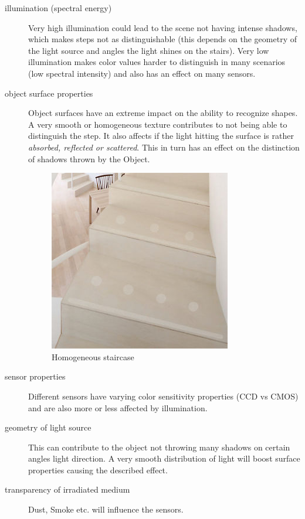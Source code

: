 \documentclass[a4paper,12pt]{article}
\begin{document}
	\begin{description}
		\item[illumination (spectral energy)] Very high illumination could lead to the scene not having intense shadows, which makes steps not as distinguishable (this depends on the geometry of the light source and angles the light shines on the stairs). Very low illumination makes color values harder to distinguish in many scenarios (low spectral intensity) and also has an effect on many sensors.
		
		\item[object surface properties] Object surfaces have an extreme impact on the ability to recognize shapes. A very smooth or homogeneous texture contributes to not being able to distinguish the step. It also affects if the light hitting the surface is rather \emph{absorbed, reflected or scattered}.	This in turn has an effect on the distinction of shadows thrown by the Object. 
				\begin{figure}[h!]
					\caption{Homogeneous staircase}	
					\centering
					\includegraphics[scale=0.5]{homogene_treppe.JPG} 
				\end{figure}
				
		\item[sensor properties] Different sensors have varying color sensitivity properties (CCD vs CMOS) and are also more or less affected by illumination.
		\item[geometry of light source] This can contribute to the object not throwing many shadows on certain angles light direction. A very smooth distribution of light will boost surface properties causing the described effect.
		\item[transparency of irradiated medium] Dust, Smoke etc. will influence the sensors.
	\end{description}
	
\end{document}

